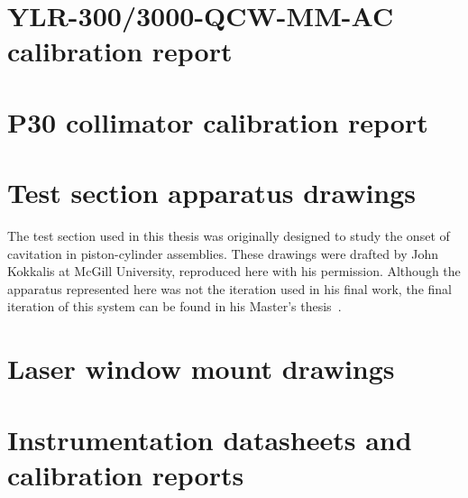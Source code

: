 \documentclass[11pt,a4paper]{report}
\begin{document}
    \clearpage
    \printbibliography[
        heading=bibintoc,
        title={References},
        block=ragged,
        prenote=bibmark
        ]
    \newpage

    \appendix
    \newcommand{\footeronly}{\thispagestyle{fancy}\markboth{}{}}
    \chapter{YLR-300/3000-QCW-MM-AC calibration report}
        \label{chp:app_YLR}
        
    \chapter{P30 collimator calibration report}
        \label{chp:app_Collimator}
        
    \chapter{Test section apparatus drawings}
        The test section used in this thesis was originally designed to study the onset of cavitation in piston-cylinder assemblies. These drawings were drafted by John Kokkalis at McGill University, reproduced here with his permission. Although the apparatus represented here was not the iteration used in his final work, the final iteration of this system can be found in his Master's thesis~\cite{kokkalisOnsetCavitationDynamically2023}.
        \label{chp:app_CavitatorDrawings}
        
    \chapter{Laser window mount drawings}
        \label{chp:app_lwmDrawings}
        
        
    \chapter{Instrumentation datasheets and calibration reports}
        \label{chp:app_calibration}
        
        
        
    
\end{document}
